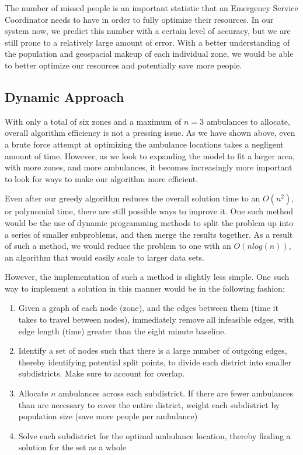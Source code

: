 \documentclass[notitlepage, 12pt]{article}
\begin{document}
The number of missed people is an important statistic that an Emergency Service Coordinator needs to have in order to fully optimize their resources. In our system now, we predict this number with a certain level of accuracy, but we are still prone to a relatively large amount of error. With a better understanding of the population and geospacial makeup of each individual zone, we would be able to better optimize our resources and potentially save more people.

\subsection{Dynamic Approach}
With only a total of six zones and a maximum of $n = 3$ ambulances to allocate, overall algorithm efficiency is not a pressing issue. As we have shown above, even a brute force attempt at optimizing the ambulance locations takes a negligent amount of time. However, as we look to expanding the model to fit a larger area, with more zones, and more ambulances, it becomes increasingly more important to look for ways to make our algorithm more efficient.

Even after our greedy algorithm reduces the overall solution time to an $O(n^2)$, or polynomial time, there are still possible ways to improve it. One such method would be the use of dynamic programming methods to split the problem up into a series of smaller subproblems, and then merge the results together. As a result of such a method, we would reduce the problem to one with an $O(nlog(n))$, an algorithm that would easily scale to larger data sets.

However, the implementation of such a method is slightly less simple. One such way to implement a solution in this manner would be in the following fashion:

\begin{enumerate}
\item Given a graph of each node (zone), and the edges between them (time it takes to travel between nodes), immediately remove all infeasible edges, with edge length (time) greater than the eight minute baseline.

\item Identify a set of nodes such that there is a large number of outgoing edges, thereby identifying potential split points, to divide each district into smaller subdistricts. Make sure to account for overlap.

\item Allocate $n$ ambulances across each subdistrict. If there are fewer ambulances than are necessary to cover the entire district, weight each subdistrict by population size (save more people per ambulance)

\item Solve each subdistrict for the optimal ambulance location, thereby finding a solution for the set as a whole
\end{enumerate}
\end{document}
